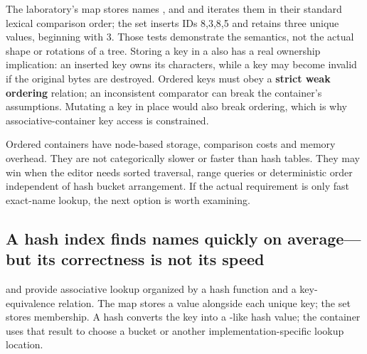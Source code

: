 The laboratory's map stores names ,  and  and iterates them in their standard lexical comparison order; the set inserts IDs 8,3,8,5 and retains three unique values, beginning with 3. Those tests demonstrate the semantics, not the actual shape or rotations of a tree. Storing a key in a  also has a real ownership implication: an inserted  key owns its characters, while a  key may become invalid if the original bytes are destroyed. Ordered keys must obey a \textbf{strict weak ordering} relation; an inconsistent comparator can break the container's assumptions. Mutating a key in place would also break ordering, which is why associative-container key access is constrained.

Ordered containers have node-based storage, comparison costs and memory overhead. They are not categorically slower or faster than hash tables. They may win when the editor needs sorted traversal, range queries or deterministic order independent of hash bucket arrangement. If the actual requirement is only fast exact-name lookup, the next option is worth examining.

\subsection{A hash index finds names quickly on average---but its correctness is not its speed}\label{05-engine-i-ch005-a-hash-index-finds-names-quickly-on-averagebut-its-correctness-is-not-its-speed}

\hypertarget{05-engine-i-ch005-a-hash-index-finds-names-quickly-on-averagebut-its-correctness-is-not-its-speed}{}

 and  provide associative lookup organized by a hash function and a key-equivalence relation. The map stores a value alongside each unique key; the set stores membership. A hash converts the key into a -like hash value; the container uses that result to choose a bucket or another implementation-specific lookup location.

